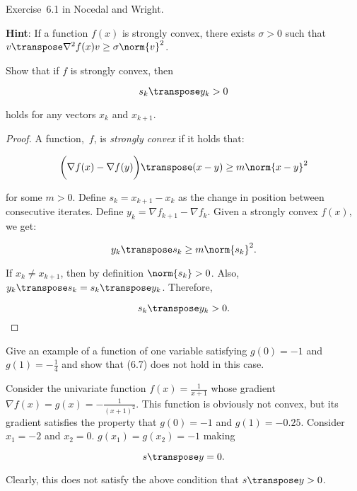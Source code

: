 \begin{problem}\label{prob:01}%
  Exercise~6.1 in Nocedal and Wright.



  \textbf{Hint}: \textnormal{If a function $f(x)$ is strongly convex, there exists $\sigma > 0$ such that $v\transpose \nabla^{2}f(x) v \geq \sigma \norm{v}^2$.}
\end{problem}

\begin{subproblem}
  Show that if $f$ is strongly convex, then

  \[ s_{k}\transpose y_k > 0 \]

  \vspace{-1em}
  holds for any vectors $x_k$ and $x_{k+1}$.
\end{subproblem}

\begin{proof}
  A function,~$f$, is \textit{strongly convex} if it holds that:

  \[\bigg(\nabla f(x) - \nabla f(y)\bigg)\transpose (x-y) \geq m \norm{x-y}^2 \]

  \noindent
  for some $m>0$.  Define $s_k=x_{k+1}-x_k$ as the change in position between consecutive iterates.  Define $y_k = \nabla f_{k+1} - \nabla f_k$. Given a strongly convex $f(x)$, we get:

  \[y_k\transpose s_k \geq m \norm{s_k}^2 \text{.}\]

  \noindent
  If $x_k \neq x_{k+1}$, then by definition $\norm{s_k}>0$. Also, $y_k\transpose s_k = s_k\transpose y_k$.  Therefore,

  \[s_k\transpose y_k >0 \text{.} \]
\end{proof}

\begin{subproblem}
  Give an example of a function of one variable satisfying $g(0)=-1$ and $g(1)=-\frac{1}{4}$ and show that (6.7) does not hold in this case.
\end{subproblem}

Consider the univariate function $f(x) =\frac{1}{x+1}$ whose gradient $\nabla f(x) = g(x)= -\frac{1}{(x+1)^2}$.  This function is obviously not convex, but its gradient satisfies the property that $g(0)=-1$ and $g(1) = -0.25$. Consider $x_1 = -2$ and $x_2 = 0$.  $g(x_1) = g(x_2) = -1$ making 

\[s\transpose y = 0 \text{.} \]

\noindent
Clearly, this does not satisfy the above condition that $s\transpose y >0$.



